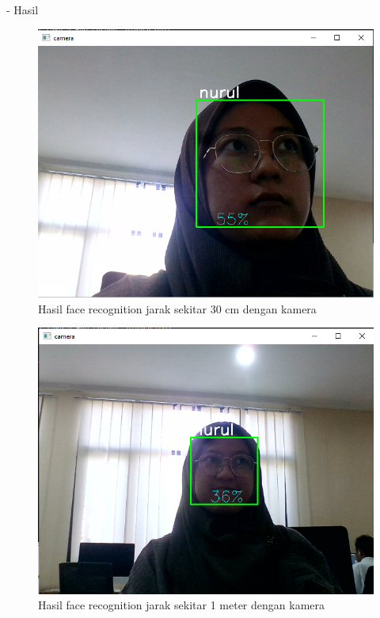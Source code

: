 \begin{enumerate}
    - Hasil
    \begin{figure}[h!]
        \centering
        \includegraphics[width=0.8\linewidth]{images/fr_cam_30cm.PNG}
        \caption{Hasil face recognition jarak sekitar 30 cm dengan kamera}
    \end{figure}
    \newpage
    \begin{figure}[h!]
        \centering
        \includegraphics[width=0.8\linewidth]{images/fr_hasil1_1m.PNG}
        \caption{Hasil face recognition jarak sekitar 1 meter dengan kamera}
    \end{figure}
\end{enumerate}